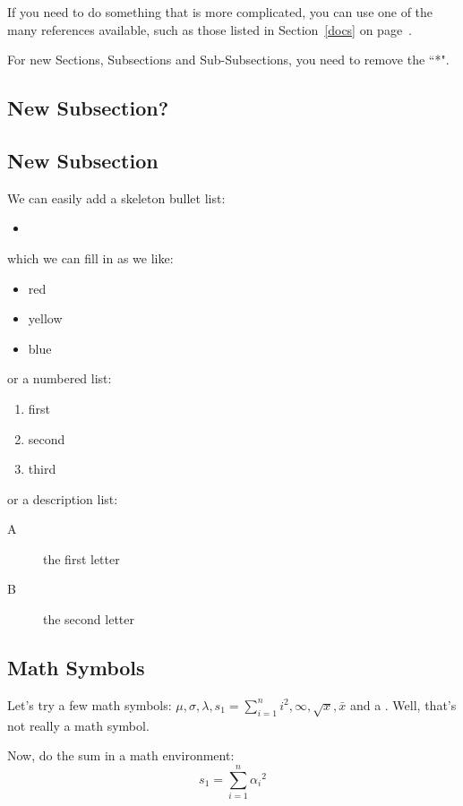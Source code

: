 \documentclass[12pt]{article}
\begin{document}
If you need to do something that is more complicated, you can use one of the many references available, such as those listed in Section~\ref{docs} on page~\pageref{docs}.

For new Sections, Subsections and Sub-Subsections, you need to remove the ``*". 

\subsection*{New Subsection?}

\subsection{New Subsection}

We can easily add a skeleton bullet list:

\begin{itemize}
  \item 
\end{itemize}

which we can fill in as we like:
\begin{itemize}
  \item red
  \item yellow
  \item blue
\end{itemize}

or a numbered list:
\begin{enumerate}
  \item first
  \item second
  \item third
\end{enumerate}

or a description list:
\begin{description}
  \item[A] the first letter
  \item[B] the second letter
\end{description}


\subsection{Math Symbols}

Let's try a few math symbols: $\mu, \sigma, \lambda,
s_1 = \sum_{i=1}^n i^2, \infty, \sqrt{x}, \bar{x}$ and a \smiley. Well, that's not really a math symbol. 


Now, do the sum in a math environment:
\[
s_1 = \sum_{i=1}^n {\alpha_i}^2
\]
\end{document}
